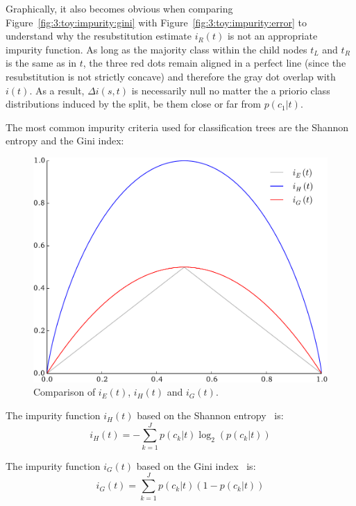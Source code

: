 Graphically, it also becomes obvious when comparing
Figure~\ref{fig:3:toy:impurity:gini} with Figure~\ref{fig:3:toy:impurity:error}
to understand why the resubstitution estimate $i_R(t)$ is not an appropriate impurity
function. As long as the majority class within the child nodes $t_L$ and $t_R$
is the same as in $t$, the three red dots remain aligned in a perfect line
(since the resubstitution is not strictly concave) and therefore the gray dot
overlap with $i(t)$. As a result, $\Delta i(s,t)$ is necessarily null no matter
the a priorio class distributions induced by the split, be them close or far
from $p(c_1|t)$.

The most common impurity criteria used for classification trees are the Shannon
entropy and the Gini index:

\begin{figure}
\centering
\includegraphics[scale=0.5]{figures/ch3_impurity_comparison.pdf}
\caption{Comparison of $i_E(t)$, $i_H(t)$ and $i_G(t)$.}
\label{fig:3:toy:impurity:comparison}
\end{figure}

\begin{definition}
The impurity function $i_H(t)$ based on the Shannon entropy~\citep{shannon:1949} is:
\begin{equation}\label{eqn:impurity:shannon}
i_H(t) = - \sum_{k=1}^J p(c_k|t) \log_2 (p(c_k|t))
\end{equation}
\end{definition}
\begin{definition}
The impurity function $i_G(t)$ based on the Gini index~\citep{gini:1912} is:
\begin{equation}\label{eqn:impurity:gini}
i_G(t) = \sum_{k=1}^J p(c_k|t) (1 - p(c_k|t))
\end{equation}
\end{definition}

